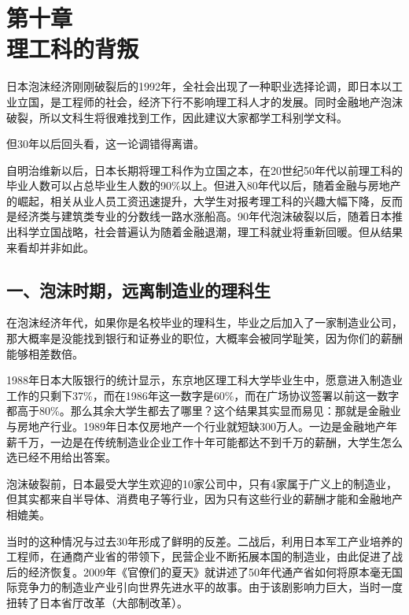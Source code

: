 

\section[第十章\q 理工科的背叛]{第十章\\ 理工科的背叛}


{\fangsong 日本泡沫经济刚刚破裂后的1992年，全社会出现了一种职业选择论调，即日本以工业立国，是工程师的社会，经济下行不影响理工科人才的发展。同时金融地产泡沫破裂，所以文科生将很难找到工作，因此建议大家都学工科别学文科。\par}

{\fangsong 但30年以后回头看，这一论调错得离谱。\par}

自明治维新以后，日本长期将理工科作为立国之本，在20世纪50年代以前理工科的毕业人数可以占总毕业生人数的90\%以上。但进入80年代以后，随着金融与房地产的崛起，相关从业人员工资迅速提升，大学生对报考理工科的兴趣大幅下降，反而是经济类与建筑类专业的分数线一路水涨船高。90年代泡沫破裂以后，随着日本推出科学立国战略，社会普遍认为随着金融退潮，理工科就业将重新回暖。但从结果来看却并非如此。

\subsection{一、泡沫时期，远离制造业的理科生}

在泡沫经济年代，如果你是名校毕业的理科生，毕业之后加入了一家制造业公司，那大概率是没能找到银行和证券业的职位，大概率会被同学耻笑，因为你们的薪酬能够相差数倍。

1988年日本大阪银行的统计显示，东京地区理工科大学毕业生中，愿意进入制造业工作的只剩下37\%，而在1986年这一数字是60\%，而在广场协议签署以前这一数字都高于80\%。那么其余大学生都去了哪里？这个结果其实显而易见：那就是金融业与房地产行业。1989年日本仅房地产一个行业就短缺300万人。一边是金融地产年薪千万，一边是在传统制造业企业工作十年可能都达不到千万的薪酬，大学生怎么选已经不用给出答案。

泡沫破裂前，日本最受大学生欢迎的10家公司中，只有4家属于广义上的制造业，但其实都来自半导体、消费电子等行业，因为只有这些行业的薪酬才能和金融地产相媲美。

当时的这种情况与过去30年形成了鲜明的反差。二战后，利用日本军工产业培养的工程师，在通商产业省的带领下，民营企业不断拓展本国的制造业，由此促进了战后的经济恢复。2009年《官僚们的夏天》就讲述了50年代通产省如何将原本毫无国际竞争力的制造业产业引向世界先进水平的故事。由于该剧影响力巨大，当时一度扭转了日本省厅改革（大部制改革）。

